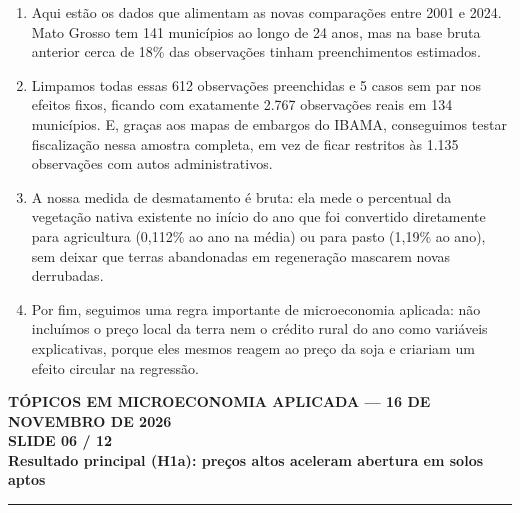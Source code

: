 \documentclass[11pt,a4paper]{article}
\newcommand{\slidenum}{1}
\begin{document}
\vspace{1mm}
\begin{enumerate}[leftmargin=*,label=\textbf{(\arabic*)},itemsep=2.6mm,topsep=1mm]
    \item Aqui estão os dados que alimentam as novas comparações entre 2001 e 2024. Mato Grosso tem 141 municípios ao longo de 24 anos, mas na base bruta anterior cerca de 18\% das observações tinham preenchimentos estimados.
    \item Limpamos todas essas 612 observações preenchidas e 5 casos sem par nos efeitos fixos, ficando com exatamente 2.767 observações reais em 134 municípios. E, graças aos mapas de embargos do IBAMA, conseguimos testar fiscalização nessa amostra completa, em vez de ficar restritos às 1.135 observações com autos administrativos.
    \item A nossa medida de desmatamento é bruta: ela mede o percentual da vegetação nativa existente no início do ano que foi convertido diretamente para agricultura (0,112\% ao ano na média) ou para pasto (1,19\% ao ano), sem deixar que terras abandonadas em regeneração mascarem novas derrubadas.
    \item Por fim, seguimos uma regra importante de microeconomia aplicada: não incluímos o preço local da terra nem o crédito rural do ano como variáveis explicativas, porque eles mesmos reagem ao preço da soja e criariam um efeito circular na regressão.
\end{enumerate}

\newpage

\renewcommand{\slidenum}{6}
\noindent
\begin{minipage}{\textwidth}
\begin{center}
{\color{cinza}\footnotesize\textbf{TÓPICOS EM MICROECONOMIA APLICADA --- 16 DE NOVEMBRO DE 2026}\\[1.2mm]}
{\color{cinza}\bfseries\Large SLIDE 06 / 12\\[1.5mm]}
{\color{verde}\bfseries\LARGE Resultado principal (H1a): preços altos aceleram abertura em solos aptos\\[2.5mm]}
\rule{\textwidth}{1pt}
\end{center}
\end{minipage}
\vspace{1.5mm}
\end{document}
